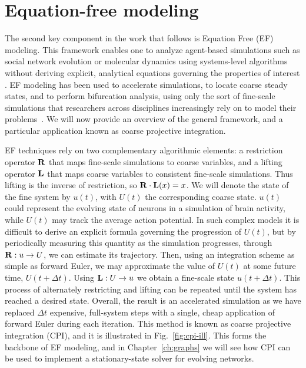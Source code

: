 \section{Equation-free modeling\label{sec:ef}}

The second key component in the work that follows is Equation Free
(EF) modeling. This framework enables one to analyze agent-based
simulations such as social network evolution or molecular dynamics
using systems-level algorithms without deriving explicit, analytical
equations governing the properties of interest
\cite{gear_equation-free_2003,kevrekidis_equation-free:_2004}. EF
modeling has been used to accelerate simulations, to locate coarse
steady states, and to perform bifurcation analysis, using only the
sort of fine-scale simulations that researchers across disciplines
increasingly rely on to model their
problems~\cite{tsoumanis_coarse-graining_2012,ferguson_systematic_2010,bold_equation-free_2014}. We
will now provide an overview of the general framework, and a
particular application known as coarse projective integration.

EF techniques rely on two complementary algorithmic elements: a
restriction operator $\mathbf{R}$ that maps fine-scale simulations to coarse
variables, and a lifting operator $\mathbf{L}$ that maps coarse variables to
consistent fine-scale simulations. Thus lifting is the inverse of
restriction, so $\mathbf{R} \cdot \mathbf{L} (x) = x$. We will denote the state of
the fine system by $u(t)$, with $U(t)$ the corresponding coarse
state. $u(t)$ could represent the evolving state of neurons in a
simulation of brain activity, while $U(t)$ may track the average
action potential. In such complex models it is difficult to derive an
explicit formula governing the progression of $U(t)$, but by
periodically measuring this quantity as the simulation progresses,
through $\mathbf{R}: u \rightarrow U$, we can estimate its trajectory. Then,
using an integration scheme as simple as forward Euler, we may
approximate the value of $U(t)$ at some future time,
$U(t + \Delta t)$. Using $\mathbf{L}: U \rightarrow u$ we obtain a fine-scale
state $u(t + \Delta t)$. This process of alternately restricting and
lifting can be repeated until the system has reached a desired
state. Overall, the result is an accelerated simulation as we have
replaced $\Delta t$ expensive, full-system steps with a single, cheap
application of forward Euler during each iteration. This method is
known as coarse projective integration (CPI), and it is illustrated in
Fig.~\ref{fig:cpi-ill}. This forms the backbone of EF modeling, and in
Chapter~\ref{ch:graphs} we will see how CPI can be used to implement a
stationary-state solver for evolving networks.

